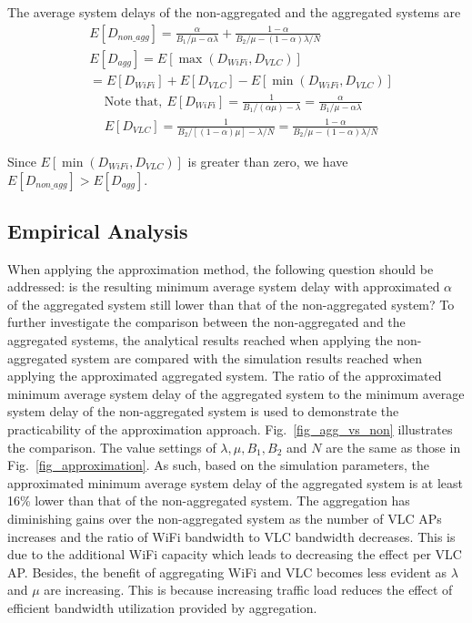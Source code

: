 \documentclass[10pt,journal]{IEEEtran}
\begin{document}
\begin{IEEEproof}
The average system delays of the non-aggregated and the aggregated systems are
\begin{align}
&E[D_{non\_agg}]=\frac{\alpha}{B_{1}/\mu-\alpha\lambda}+\frac{1-\alpha}{B_{2}/\mu-(1-\alpha)\lambda/N}\nonumber\\
&E[D_{agg}]=E[\max(D_{WiFi},D_{VLC})]\nonumber\\
&=E[D_{WiFi}]+E[D_{VLC}]-E[\min(D_{WiFi},D_{VLC})]\nonumber
\end{align}
\vspace{-0.5cm}
\begin{align}
&\text{Note that},~E[D_{WiFi}]=\frac{1}{B_{1}/(\alpha\mu)-\lambda}=\frac{\alpha}{B_{1}/\mu-\alpha\lambda}\nonumber\\
&E[D_{VLC}]=\frac{1}{B_{2}/[(1-\alpha)\mu]-\lambda/N}=\frac{1-\alpha}{B_{2}/\mu-(1-\alpha)\lambda/N}\nonumber
\end{align}

Since $E[\min(D_{WiFi},D_{VLC})]$ is greater than zero, we have $E[D_{non\_agg}]>E[D_{agg}]$.

\end{IEEEproof}

\subsection{Empirical Analysis}
When applying the approximation method, the following question should be addressed: is the resulting minimum average system delay with approximated $\alpha$ of the aggregated system still lower than that of the non-aggregated system? To further investigate the comparison between the non-aggregated and the aggregated systems, the analytical results reached when applying the non-aggregated system are compared with the simulation results reached when applying the approximated aggregated system. The ratio of the approximated minimum average system delay of the aggregated system to the minimum average system delay of the non-aggregated system is used to demonstrate the practicability of the approximation approach. Fig.~\ref{fig_agg_vs_non} illustrates the comparison. The value settings of $\lambda, \mu, B_{1}, B_{2}$ and $N$ are the same as those in Fig.~\ref{fig_approximation}. As such, based on the simulation parameters, the approximated minimum average system delay of the aggregated system is at least 16\% lower than that of the non-aggregated system. The aggregation has diminishing gains over the non-aggregated system as the number of VLC APs increases and the ratio of WiFi bandwidth to VLC bandwidth decreases. This is due to the additional WiFi capacity which leads to decreasing the effect per VLC AP. Besides, the benefit of aggregating WiFi and VLC becomes less evident as $\lambda$ and $\mu$ are increasing. This is because increasing traffic load reduces the effect of efficient bandwidth utilization provided by aggregation.
\end{document}
